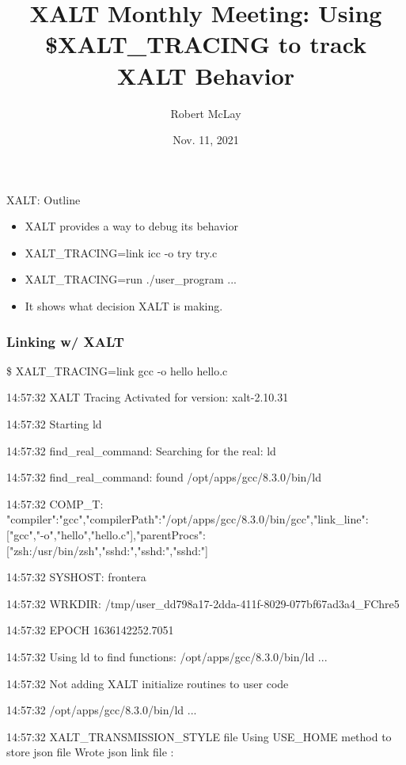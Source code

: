 \documentclass{beamer}
\begin{document}
\title[XALT]{XALT Monthly Meeting: Using \$XALT\_TRACING to track XALT Behavior }
\author{Robert McLay} 
\date{Nov. 11, 2021} 

\frame{\titlepage} 

\begin{frame}{XALT: Outline}
  \begin{itemize}
    \item XALT provides a way to debug its behavior
    \item XALT\_TRACING=link  icc -o try try.c
    \item XALT\_TRACING=run ./user\_program ...
    \item It shows what decision XALT is making.
  \end{itemize}
\end{frame}

\begin{frame}[fragile]
    \frametitle{Linking w/ XALT}
 {\tiny
    \begin{semiverbatim}
\$ XALT_TRACING=link gcc -o hello hello.c

14:57:32 XALT Tracing Activated for version: xalt-2.10.31

14:57:32 Starting ld

14:57:32 find_real_command: Searching for the real: ld

14:57:32 find_real_command: found /opt/apps/gcc/8.3.0/bin/ld

14:57:32 COMP_T: {"compiler":"gcc","compilerPath":"/opt/apps/gcc/8.3.0/bin/gcc","link_line":["gcc","-o","hello","hello.c"],"parentProcs":["zsh:/usr/bin/zsh","sshd:","sshd:","sshd:"]}

14:57:32 SYSHOST: frontera

14:57:32 WRKDIR: /tmp/user_dd798a17-2dda-411f-8029-077bf67ad3a4_FChre5

14:57:32 EPOCH 1636142252.7051

14:57:32 Using ld to find functions:  /opt/apps/gcc/8.3.0/bin/ld ...

14:57:32 Not adding XALT initialize routines to user code

14:57:32 /opt/apps/gcc/8.3.0/bin/ld ...

14:57:32 XALT_TRANSMISSION_STYLE file
    Using USE_HOME method to store json file
    Wrote json link file : 
   \end{semiverbatim}
}
\end{frame}
\end{document}
